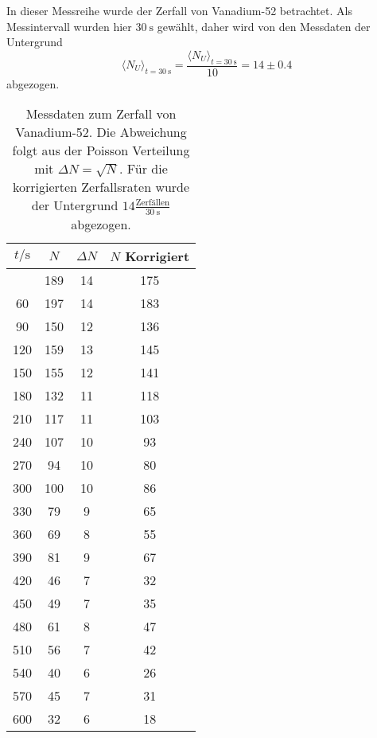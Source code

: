 In dieser Messreihe wurde der Zerfall von Vanadium-52 betrachtet. Als Messintervall wurden hier
$\SI{30}{\second}$ gewählt, daher wird von den Messdaten der Untergrund
\begin{equation}
	\langle N_U \rangle_{t=\SI{30}{\second}} = 
	\frac{\langle N_U \rangle_{t=\SI{30}{\second}}}{10} = 14 \pm 0.4
\end{equation}
abgezogen.

\begin{longtable}{c c c c}
	\caption{Messdaten zum Zerfall von Vanadium-52. Die Abweichung folgt aus der Poisson Verteilung
		mit $\Delta N = \sqrt{N}$. Für die korrigierten Zerfallsraten wurde der Untergrund 
	$14 \frac{\text{Zerfällen}}{\SI{30}{\second}}$ abgezogen.} \label{tab:vanadium} \\
		\hline
		$t / \si{\second}$ & $N$ & $\Delta N$ &$N$ Korrigiert \\
		\hline
		\endhead
		\hline
		\endfoot
		30   	&      189  	& 14 &      175 \\
		  60   	&      197  	& 14 &      183 \\
		  90   	&      150  	& 12 &      136 \\
		 120   	&      159  	& 13 &      145 \\
		 150   	&      155  	& 12 &      141 \\
		 180   	&      132  	& 11 &      118 \\
		 210   	&      117  	& 11 &      103 \\
		 240   	&      107  	& 10 &       93 \\
		 270   	&       94  	& 10 &       80 \\
		 300   	&      100  	& 10 &       86 \\
		 330   	&       79  	&  9 &       65 \\
		 360   	&       69  	&  8 &       55 \\
		 390   	&       81  	&  9 &       67 \\
		 420   	&       46  	&  7 &       32 \\
		 450   	&       49  	&  7 &       35 \\
		 480   	&       61  	&  8 &       47 \\
		 510   	&       56  	&  7 &       42 \\
		 540   	&       40  	&  6 &       26 \\
		 570   	&       45  	&  7 &       31 \\
		 600   	&       32  	&  6 &       18 \\

\end{longtable}
